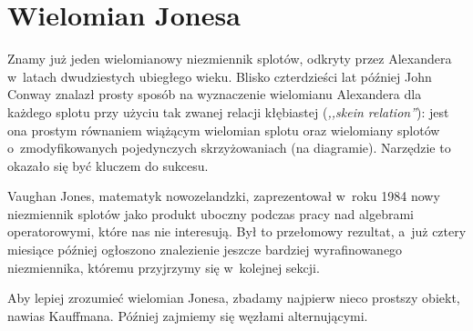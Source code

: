 \section{Wielomian Jonesa} %
\label{sec:jones}

Znamy już jeden wielomianowy niezmiennik splotów, odkryty przez Alexandera w~latach dwudziestych ubiegłego wieku.
Blisko czterdzieści lat później John Conway znalazł prosty sposób na wyznaczenie wielomianu
Alexandera dla każdego splotu przy użyciu tak zwanej relacji kłębiastej (\emph{,,skein relation''}):
jest ona prostym równaniem wiążącym wielomian splotu oraz wielomiany
splotów o~zmodyfikowanych pojedynczych skrzyżowaniach (na diagramie).
Narzędzie to okazało się być kluczem do sukcesu.

Vaughan Jones, matematyk nowozelandzki, zaprezentował w~roku 1984 nowy niezmiennik splotów
jako produkt uboczny podczas pracy nad algebrami operatorowymi, które nas nie interesują.
Był to przełomowy rezultat, a~już cztery miesiące później ogłoszono znalezienie
jeszcze bardziej wyrafinowanego niezmiennika, któremu przyjrzymy się w~kolejnej sekcji.

Aby lepiej zrozumieć wielomian Jonesa, zbadamy najpierw nieco prostszy obiekt, nawias Kauffmana.
Później zajmiemy się węzłami alternującymi.







